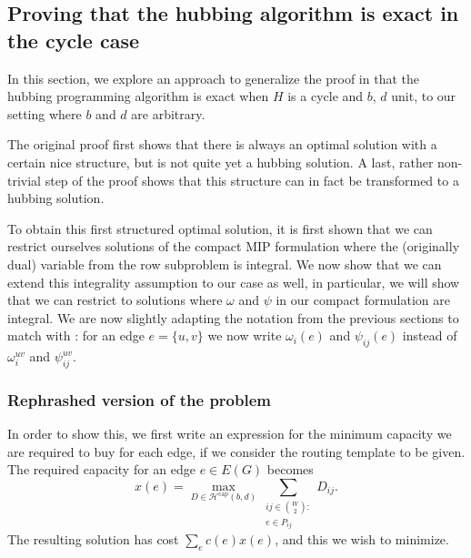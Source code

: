 \subsection{Proving that the hubbing algorithm is exact in the cycle case}
In this section, we explore an approach to generalize the proof in \cite{bosman2017exploring} that the hubbing programming algorithm is exact when $H$ is a cycle and $b$, $d$ unit, to our setting where $b$ and $d$ are arbitrary.

The original proof first shows that there is always an optimal solution with a certain nice structure, but is not quite yet a hubbing solution.
A last, rather non-trivial step of the proof shows that this structure can in fact be transformed to a hubbing solution.


To obtain this first structured optimal solution, it is first shown that we can restrict ourselves solutions of the compact MIP formulation where the (originally dual) variable from the row subproblem is integral.
We now show that we can extend this integrality assumption to our case as well, in particular, we will show that we can restrict to solutions where $\omega$ and $\psi$ in our compact formulation are integral.
We are now slightly adapting the notation from the previous sections to match with \cite{bosman2017exploring}: for an edge $e = \{u, v\}$ we now write $\omega_i(e)$ and $\psi_{ij}(e)$ instead of $\omega_i^{uv}$ and $\psi_{ij}^{uv}$.

\subsubsection{Rephrashed version of the problem}
In order to show this, we first write an expression for the minimum capacity we are required to buy for each edge, if we consider the routing template to be given.
The required capacity for an edge $e \in E(G)$ becomes
\[
    x(e) = \max_{D \in \mathcal H^\text{cap}(b, d)} \sum_{\substack{ij \in \binom W 2 :\\e \in P_{ij}}} D_{ij}.
\]
The resulting solution has cost $\sum_e c(e) x(e)$, and this we wish to minimize.

